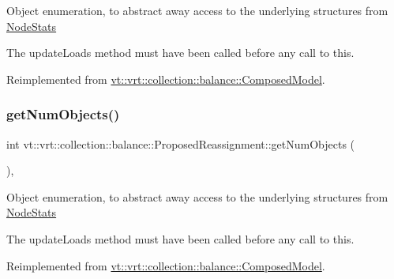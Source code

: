 Object enumeration, to abstract away access to the underlying structures from \hyperlink{structvt_1_1vrt_1_1collection_1_1balance_1_1_node_stats}{Node\+Stats}

The {\ttfamily update\+Loads} method must have been called before any call to this. 

Reimplemented from \hyperlink{classvt_1_1vrt_1_1collection_1_1balance_1_1_composed_model_a8f34205887c08a22a1e5bef6ee358f2b}{vt\+::vrt\+::collection\+::balance\+::\+Composed\+Model}.

\mbox{\label{structvt_1_1vrt_1_1collection_1_1balance_1_1_proposed_reassignment_ad265d4881094bb11cb538e7340bc8a49}} 
\subsubsection{\texorpdfstring{get\+Num\+Objects()}{getNumObjects()}}
{\footnotesize\ttfamily int vt\+::vrt\+::collection\+::balance\+::\+Proposed\+Reassignment\+::get\+Num\+Objects (\begin{DoxyParamCaption}{ }\end{DoxyParamCaption})\hspace{0.3cm}{\ttfamily [override]}, {\ttfamily [virtual]}}

Object enumeration, to abstract away access to the underlying structures from \hyperlink{structvt_1_1vrt_1_1collection_1_1balance_1_1_node_stats}{Node\+Stats}

The {\ttfamily update\+Loads} method must have been called before any call to this. 

Reimplemented from \hyperlink{classvt_1_1vrt_1_1collection_1_1balance_1_1_composed_model_a7b383954706cb8069e841a87c3ff3f8f}{vt\+::vrt\+::collection\+::balance\+::\+Composed\+Model}.

\mbox{\label{structvt_1_1vrt_1_1collection_1_1balance_1_1_proposed_reassignment_ac865e7afd9b830328a31b947aed65f05}} 

